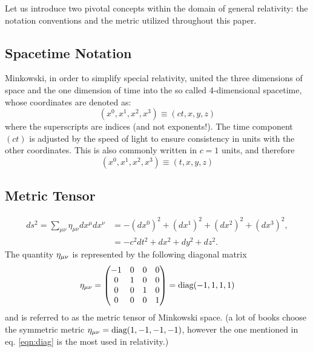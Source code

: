 Let us introduce two pivotal concepts within the domain of general relativity: the notation conventions and the metric utilized throughout this paper.
\subsection{Spacetime Notation}
Minkowski, in order to simplify special relativity, united the three dimensions of space and the one dimension of time into the so called 4-dimensional spacetime, whose coordinates are denoted as:
\begin{equation}
\label{eqn:STC}
(x^0,x^1,x^2,x^3)\equiv(ct,x,y,z)
\end{equation}
where the superscripts are indices (and not exponents!). The time component $(ct)$ is adjusted by the speed of light to ensure consistency in units with the other coordinates. This is also commonly written in $c=1$ units, and therefore
\begin{equation}
(x^0,x^1,x^2,x^3)\equiv(t,x,y,z)
\end{equation}
\subsection{Metric Tensor}
\begin{equation}
\begin{aligned}
ds^2=\sum_{\mu\nu}\eta_{\mu\nu}dx^\mu dx^\nu&=-(dx^0)^2+(dx^1)^2+(dx^2)^2+(dx^3)^2,\\
&=-c^2dt^2+dx^2+dy^2+dz^2.
\end{aligned}
\end{equation}
The quantity $\eta_{\mu\nu}$ is represented by the following diagonal matrix
\begin{equation}
\label{eqn:diag}
\eta_{\mu\nu}=
\begin{pmatrix}
-1 & 0 & 0 & 0\\
0 & 1 &0 & 0\\
0 & 0 & 1 & 0\\
0 & 0 & 0 & 1
\end{pmatrix}
=\text{diag}(-1,1,1,1)
\end{equation}
and is referred to as the metric tensor of Minkowski space. (a lot of books choose the symmetric metric $\eta_{\mu\nu}=\text{diag}(1,-1,-1,-1)$, however the one mentioned in eq.  \eqref{eqn:diag} is the most used in relativity.)